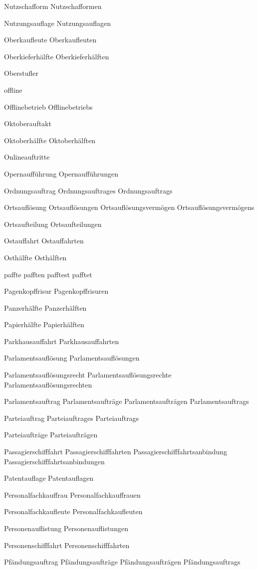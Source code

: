 Nutzschafform
Nutzschafformen

Nutzungsauflage
Nutzungsauflagen

Oberkaufleute
Oberkaufleuten

Oberkieferhälfte
Oberkieferhälften

Oberstufler

offline

Offlinebetrieb
Offlinebetriebs

Oktoberauftakt

Oktoberhälfte
Oktoberhälften

Onlineauftritte

Opernaufführung
Opernaufführungen

Ordnungsauftrag
Ordnungsauftrages
Ordnungsauftrags

Ortsauflösung
Ortsauflösungen
Ortsauflösungsvermögen
Ortsauflösungsvermögens

Ortsaufteilung
Ortsaufteilungen

Ostauffahrt
Ostauffahrten

Osthälfte
Osthälften

paffte
pafften
pafftest
pafftet

Pagenkopffrisur
Pagenkopffrisuren

Panzerhälfte
Panzerhälften

Papierhälfte
Papierhälften

Parkhausauffahrt
Parkhausauffahrten

Parlamentsauflösung
Parlamentsauflösungen

Parlamentsauflösungsrecht
Parlamentsauflösungsrechte
Parlamentsauflösungsrechten

Parlamentsauftrag
Parlamentsaufträge
Parlamentsaufträgen
Parlamentsauftrags

Parteiauftrag
Parteiauftrages
Parteiauftrags

Parteiaufträge
Parteiaufträgen

Passagierschifffahrt
Passagierschifffahrten
Passagierschifffahrtsanbindung
Passagierschifffahrtsanbindungen

Patentauflage
Patentauflagen

Personalfachkauffrau
Personalfachkauffrauen

Personalfachkaufleute
Personalfachkaufleuten

Personenauflistung
Personenauflistungen

Personenschifffahrt
Personenschifffahrten

Pfändungsauftrag
Pfändungsaufträge
Pfändungsaufträgen
Pfändungsauftrags

